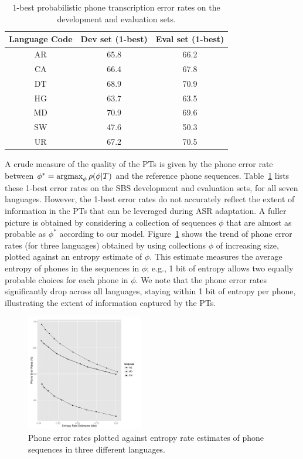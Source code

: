 \begin{table}[t]
\centering
\begin{tabular}{| c || c | c |}
\hline
Language Code & Dev set (1-best) & Eval set (1-best) \\
\hline
AR & 65.8 & 66.2 \\
CA & 66.4 & 67.8 \\
DT & 68.9 & 70.9 \\
HG & 63.7 & 63.5 \\
MD & 70.9 & 69.6 \\
SW & 47.6 & 50.3 \\
UR & 67.2 & 70.5  \\
\hline
\end{tabular}
\caption{1-best probabilistic phone transcription error rates on the development and evaluation sets.}
\label{tab:LPER}
\end{table}

A crude measure of the quality of the PTs is given by the phone error
rate between $\phi^* = \operatorname*{argmax}_{\phi} \rho(\phi|T)$ and the reference
phone sequences. Table~\ref{tab:LPER} lists these 1-best error rates
on the SBS development and evaluation sets, for all seven
languages. However, the 1-best error rates do not accurately reflect
the extent of information in the PTs that can be leveraged during ASR
adaptation. A fuller picture is obtained by considering a collection
of sequences $\phi$ that are almost as probable as $\phi^*$ according
to our model. Figure~\ref{fig:listPER} shows the trend of phone error
rates (for three languages) obtained by using collections $\phi$ of
increasing size, plotted against an entropy estimate of $\phi$. This
estimate measures the average entropy of phones in the sequences in
$\phi$; e.g., 1 bit of entropy allows two equally probable choices for
each phone in $\phi$. We note that the phone error rates significantly
drop across all languages, staying within 1 bit of entropy per phone,
illustrating the extent of information captured by the PTs.

\begin{figure}[t!]
\begin{center}
\includegraphics[width=2in]{../figs/listper.pdf}
\end{center}
\caption{Phone error rates plotted against entropy rate estimates of phone sequences in three different languages.}
\label{fig:listPER}
\end{figure}

